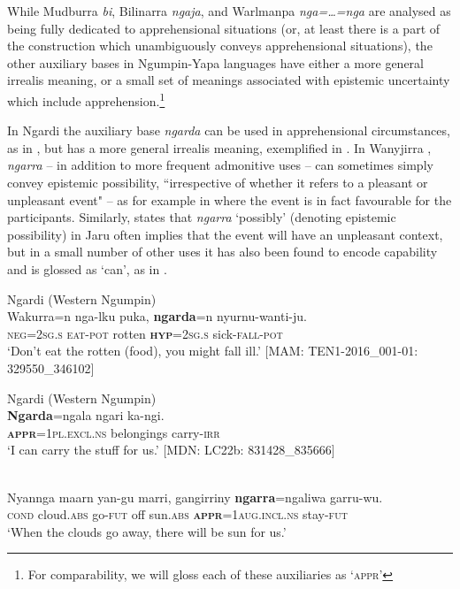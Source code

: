 \documentclass[output=paper,colorlinks,citecolor=brown]{langscibook}
\begin{document}

While Mudburra \textit{bi}, Bilinarra \textit{ngaja}, and Warlmanpa \textit{nga=\ldots=nga} are analysed as being fully dedicated to apprehensional situations (or, at least there is a part of the construction which unambiguously conveys apprehensional situations), the other auxiliary bases in Ngumpin-Yapa languages have either a more general irrealis meaning, or a small set of meanings associated with epistemic uncertainty which include apprehension.\footnote{For comparability, we will gloss each of these auxiliaries as \textsc{`appr'}}

In Ngardi the auxiliary base \textit{ngarda} can be used in apprehensional circumstances, as in , but has a more general irrealis meaning, exemplified in . In Wanyjirra \citep[643]{senge_grammar_2015}, \textit{ngarra} -- in addition to more frequent admonitive uses -- can sometimes simply convey epistemic possibility, ``irrespective of whether it refers to a pleasant or unpleasant event" -- as for example in  where the event is in fact favourable for the participants. Similarly, \citet[204]{tsunoda_djaru_1981} states that \textit{ngarra} `possibly' (denoting epistemic possibility) in Jaru often implies that the event will have an unpleasant context, but in a small number of other uses it has also been found to encode capability and is glossed as `can', as in .

\ea 
\textnormal{Ngardi (Western Ngumpin)} \\
\gll Wakurra=n nga-lku puka, \textbf{ngarda}=n nyurnu-wanti-ju. \\
\textsc{neg=2sg.s} \textsc{eat-pot} rotten \textsc{\textbf{hyp}=2sg.s} sick-\textsc{fall-pot} \\
\glt `Don't eat the rotten (food), you might fall ill.' $[$MAM: TEN1-2016\_001-01: 329550\_346102$]$
\label{ex:bro62}
\z

\ea 
\textnormal{Ngardi (Western Ngumpin)} \\
\gll \textbf{Ngarda}=ngala ngari ka-ngi. \\
\textsc{\textbf{appr}=1pl.excl.ns} belongings carry-\textsc{irr} \\
\glt `I can carry the stuff for us.' $[$MDN: LC22b: 831428\_835666$]$
\label{ex:bro63}
\z

\ea
{} \\
\gll Nyannga maarn yan-gu marri, gangirriny \textbf{ngarra}=ngaliwa garru-wu. \\
\textsc{cond} cloud.\textsc{abs} go-\textsc{fut} off sun.\textsc{abs} \textsc{\textbf{appr}=1aug.incl.ns} stay-\textsc{fut} \\
\glt `When the clouds go away, there will be sun for us.' 
\label{ex:bro64}
\z
\end{document}
